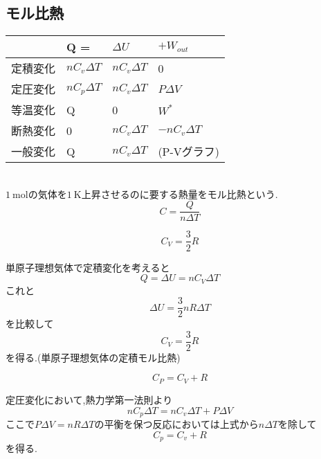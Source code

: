 \documentclass[dvipdfmx,uplatex]{jsarticle}
\begin{document}
\subsection{モル比熱}
\begin{table}[htb]
\begin{center}
	\begin{tabular}{|l|lll|}
		&Q =	&$\Delta U$	&$+W_{out}$ \\ \hline
	定積変化	&$nC_v \Delta T$	&$nC_v \Delta T$&0 \\
	定圧変化	&$nC_p \Delta T$	&$nC_v \Delta T$&$P \Delta V$\\
	等温変化	&Q&0&$W^*$\\
	断熱変化	&0&$nC_v \Delta T$ &$-nC_v \Delta T$\\
	一般変化	&Q&$nC_v \Delta T$&(P-Vグラフ)
	\end{tabular}
\end{center}
\end{table}
\begin{defi}[モル比熱] \mbox{} \\
$\SI{1}{\mole}$の気体を$\SI{1}{\kelvin}$上昇させるのに要する熱量をモル比熱という.
\[
C = \frac{Q}{n \Delta T} 
\]
\end{defi}
\begin{theo}[単原子理想気体の定積モル比熱]
\[
C_V = \frac{3}{2}R
\]
\end{theo}
単原子理想気体で定積変化を考えると
\[
Q = \Delta U = nC_V \Delta T
\]
これと
\[
\Delta U = \frac{3}{2}nR \Delta T
\]
を比較して
\[
C_V = \frac{3}{2} R
\]
を得る.(単原子理想気体の定積モル比熱)


\begin{theo}[Mayerの関係式]
\[
C_P =C_V + R
\]
\end{theo}
定圧変化において,熱力学第一法則より
\[
nC_p \Delta T = nC_v \Delta T + P \Delta V
\]
ここで$P \Delta V = nR \Delta T$の平衡を保つ反応においては上式から$n \Delta T$を除して
\[
C_p = C_v + R
\]
を得る.
\end{document}
